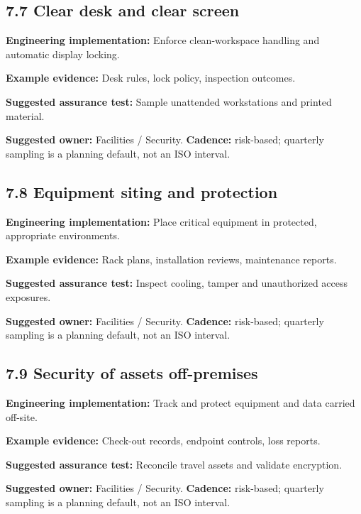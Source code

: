 \documentclass[11pt,letterpaper]{article}
\begin{document}
\subsection{7.7 Clear desk and clear screen}
\textbf{Engineering implementation:} Enforce clean-workspace handling and automatic display locking.\par
\textbf{Example evidence:} Desk rules, lock policy, inspection outcomes.\par
\textbf{Suggested assurance test:} Sample unattended workstations and printed material.\par
\textbf{Suggested owner:} Facilities / Security. \textbf{Cadence:} risk-based; quarterly sampling is a planning default, not an ISO interval.\par
{}
\subsection{7.8 Equipment siting and protection}
\textbf{Engineering implementation:} Place critical equipment in protected, appropriate environments.\par
\textbf{Example evidence:} Rack plans, installation reviews, maintenance reports.\par
\textbf{Suggested assurance test:} Inspect cooling, tamper and unauthorized access exposures.\par
\textbf{Suggested owner:} Facilities / Security. \textbf{Cadence:} risk-based; quarterly sampling is a planning default, not an ISO interval.\par
{}
\subsection{7.9 Security of assets off-premises}
\textbf{Engineering implementation:} Track and protect equipment and data carried off-site.\par
\textbf{Example evidence:} Check-out records, endpoint controls, loss reports.\par
\textbf{Suggested assurance test:} Reconcile travel assets and validate encryption.\par
\textbf{Suggested owner:} Facilities / Security. \textbf{Cadence:} risk-based; quarterly sampling is a planning default, not an ISO interval.\par
{}
\end{document}
